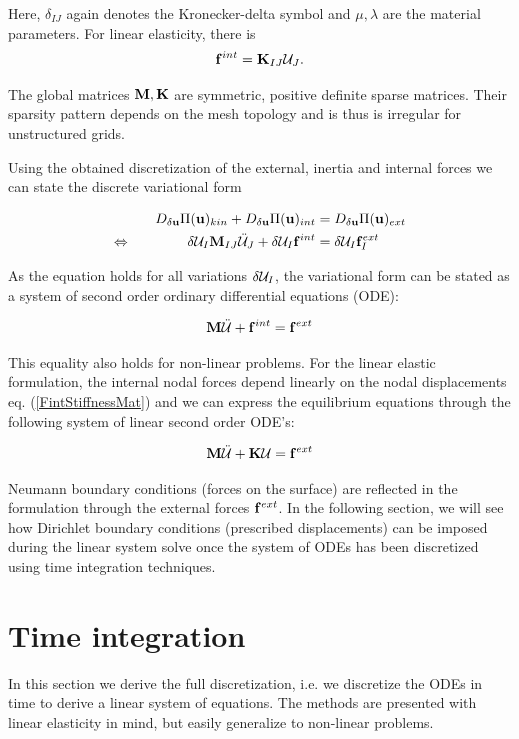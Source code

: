 Here, $\delta_{IJ}$ again denotes the Kronecker-delta symbol and $\mu, \lambda$ are the material parameters. For linear elasticity, there is
\begin{equation}
\mathbf f ^{int} = \mathbf K_{IJ} \mathcal{U} _{J}.
\label{FintStiffnessMat}
\end{equation}

The global matrices $\mathbf M, \mathbf K$ are symmetric, positive definite sparse matrices. Their sparsity pattern depends on the mesh topology and is thus is irregular for unstructured grids. 

Using the obtained discretization of the external, inertia and internal forces we can state the discrete variational form

 \begin{alignat}{1}
 D_{\delta \mathbf {u} } \Pi (\mathbf {u} )_{kin} + D_{\delta \mathbf {u} } \Pi (\mathbf {u} )_{int} &= D_{\delta \mathbf {u} } \Pi (\mathbf {u} )_{ext}  \\
 \Leftrightarrow \qquad \qquad \delta \mathcal{U}  _I \mathbf M_{IJ} \ddot{\mathcal{U} }_J + \delta \mathcal{U} _I \mathbf f ^{int} &= \delta \mathcal{U}  _I \mathbf f ^{ext}_I
\end{alignat}

As the equation holds for all variations $\delta \mathcal{U} _I$, the variational form can be stated as a system of second order ordinary differential equations (ODE):

 \begin{eqnarray}
\mathbf M \ddot{\mathcal{U} } +  \mathbf f ^{int} = \mathbf f ^{ext}  
\label{DisEquationOfMotion}
\end{eqnarray}

This equality also holds for non-linear problems. For the linear elastic formulation, the internal nodal forces depend linearly on the nodal displacements eq. (\ref{FintStiffnessMat}) and we can express the equilibrium equations through the following system of linear second order ODE's:

 \begin{alignat}{1}
\mathbf M \ddot{\mathcal{U} } +  \mathbf K \mathcal{U}  = \mathbf f ^{ext}
\label{LinMatEquationOfMotion}
\end{alignat}

Neumann boundary conditions (forces on the surface) are reflected in the formulation through the external forces $\mathbf f ^{ext}$. In the following section, we will see how Dirichlet boundary conditions (prescribed displacements) can be imposed during the linear system solve once the system of ODEs has been discretized using time integration techniques.


\section{Time integration}
\label{TimeIntegration}
In this section we derive the full discretization, i.e. we discretize the ODEs in time to derive a linear system of equations. The methods are presented with linear elasticity in mind, but easily generalize to non-linear problems. 


